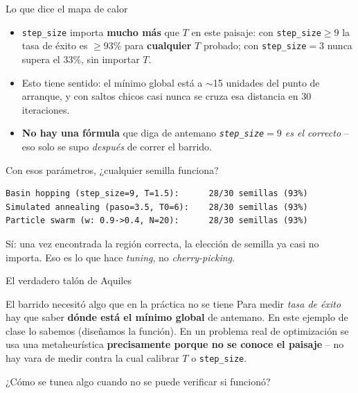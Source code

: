 \documentclass[aspectratio=169,10pt]{beamer}
\begin{document}
\begin{frame}[fragile]{Lo que dice el mapa de calor}
  \begin{itemize}
    \item \texttt{step\_size} importa \textbf{mucho más} que $T$ en
      este paisaje: con \texttt{step\_size}$\ge 9$ la tasa de éxito es
      $\ge 93\%$ para \textbf{cualquier} $T$ probado; con
      \texttt{step\_size}$=3$ nunca supera el 33\%, sin importar $T$.
    \item Esto tiene sentido: el mínimo global está a $\sim$15
      unidades del punto de arranque, y con saltos chicos casi nunca
      se cruza esa distancia en 30 iteraciones.
    \item \textbf{No hay una fórmula} que diga de antemano
      \emph{\texttt{step\_size}$=9$ es el correcto} -- eso solo se supo
      \emph{después} de correr el barrido.
  \end{itemize}
  \begin{block}{Con esos parámetros, ¿cualquier semilla funciona?}
\begin{lstlisting}
Basin hopping (step_size=9, T=1.5):      28/30 semillas (93%)
Simulated annealing (paso=3.5, T0=6):    28/30 semillas (93%)
Particle swarm (w: 0.9->0.4, N=20):      28/30 semillas (93%)
\end{lstlisting}
  \end{block}
  Sí: una vez encontrada la región correcta, la elección de semilla ya
  casi no importa. Eso es lo que hace \emph{tuning}, no
  \emph{cherry-picking}.
\end{frame}

\begin{frame}{El verdadero talón de Aquiles}
  \begin{alertblock}{El barrido necesitó algo que en la práctica no
    se tiene}
    Para medir \emph{tasa de éxito} hay que saber \textbf{dónde está el
    mínimo global} de antemano. En este ejemplo de clase lo sabemos
    (diseñamos la función). En un problema real de optimización se
    usa una metaheurística \textbf{precisamente porque no se conoce el
    paisaje} -- no hay vara de medir contra la cual calibrar $T$ o
    \texttt{step\_size}.
  \end{alertblock}
  \begin{center}
    \Large ¿Cómo se tunea algo cuando no se puede verificar si
    funcionó?
  \end{center}
\end{frame}
\end{document}
